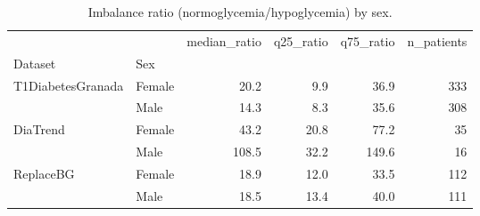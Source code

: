 \begin{table}
\caption{Imbalance ratio (normoglycemia/hypoglycemia) by sex.}
\label{tab:imbalance_ratio_sex}
\begin{tabular}{llrrrr}
\toprule
 &  & median\_ratio & q25\_ratio & q75\_ratio & n\_patients \\
Dataset & Sex &  &  &  &  \\
\midrule
\multirow[t]{2}{*}{T1DiabetesGranada} & Female & 20.2 & 9.9 & 36.9 & 333 \\
 & Male & 14.3 & 8.3 & 35.6 & 308 \\
\cline{1-6}
\multirow[t]{2}{*}{DiaTrend} & Female & 43.2 & 20.8 & 77.2 & 35 \\
 & Male & 108.5 & 32.2 & 149.6 & 16 \\
\cline{1-6}
\multirow[t]{2}{*}{ReplaceBG} & Female & 18.9 & 12.0 & 33.5 & 112 \\
 & Male & 18.5 & 13.4 & 40.0 & 111 \\
\cline{1-6}
\bottomrule
\end{tabular}
\end{table}
